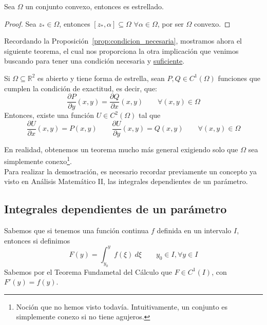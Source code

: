 \begin{prop}
    Sea $\Omega$ un conjunto convexo, entonces es estrellado.
    \begin{proof}
        Sea $z_\ast \in \Omega$, entonces $[z_\ast, \alpha]\subseteq \Omega$ $\forall \alpha\in \Omega$, por ser $\Omega$ convexo.
    \end{proof}
\end{prop}

\noindent
Recordando la Proposición~\ref{prop:condicion_necesaria}, mostramos ahora el siguiente teorema, el cual nos proporciona la otra implicación que venimos buscando para tener una condición necesaria y \underline{suficiente}.
\begin{teo}\label{teo:condicion_suficiente}
    Si $\Omega\subseteq \mathbb{R}^2$ es abierto y tiene forma de estrella, sean $P,Q\in C^1(\Omega)$ funciones que cumplen la condición de exactitud, es decir, que:
    \begin{equation*}
        \dfrac{\partial P}{\partial y}(x,y) = \dfrac{\partial Q}{\partial x}(x,y) \qquad \forall (x,y)\in \Omega
    \end{equation*}
    Entonces, existe una función $U\in C^2(\Omega)$ tal que 
    \begin{equation*}
        \dfrac{\partial U}{\partial x}(x,y) = P(x,y) \qquad \dfrac{\partial U}{\partial y}(x,y) = Q(x,y) \qquad \forall (x,y)\in \Omega
    \end{equation*}
\end{teo}
\noindent
En realidad, obtenemos un teorema mucho más general exigiendo solo que $\Omega$ sea simplemente conexo\footnote{Noción que no hemos visto todavía. Intuitivamente, un conjunto es simplemente conexo si no tiene agujeros.}.\\

Para realizar la demostración, es necesario recordar previamente un concepto ya visto en Análisis Matemático II\@, las integrales dependientes de un parámetro.
\subsection{Integrales dependientes de un parámetro}
Sabemos que si tenemos una función continua $f$ definida en un intervalo $I$, entonces si definimos
\begin{equation*}
    F(y) = \int_{y_0}^{y} f(\xi)~d\xi  \qquad y_0\in I, \forall y\in I
\end{equation*}
Sabemos por el Teorema Fundametal del Cálculo que $F\in C^1(I)$, con $F'(y) = f(y)$.\\

